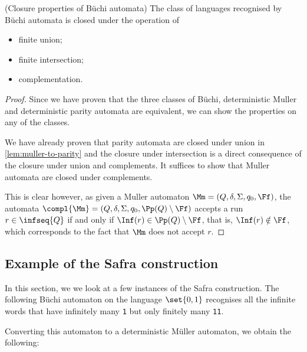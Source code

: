 \begin{theorem}(Closure properties of Büchi automata)
    \label{thm:closure-of-buchi}
    The class of languages recognised by Büchi automata
    is closed under the operation of \begin{itemize}
        \item finite union;
        \item finite intersection;
        \item complementation.
    \end{itemize}
\end{theorem}
\begin{proof}
    Since we have proven that the three classes of Büchi,
    deterministic Muller and deterministic parity automata
    are equivalent, we can show the properties on any of the classes.

    We have already proven that parity automata are closed
    under union in \autoref{lem:muller-to-parity}
    and the closure under intersection
    is a direct consequence of the closure under union and complements.
    It suffices to show that Muller automata are closed under complements.

    This is clear however, as given a Muller automaton $\Mm = (Q, \delta, \Sigma, q_0, \Ff)$,
    the automata $\compl{\Mm} = (Q, \delta, \Sigma, q_0, \Pp(Q) \setminus \Ff)$
    accepts a run $r \in \infseq{Q}$ if and only if $\Inf(r) \in \Pp(Q) \setminus \Ff$, that is,
    $\Inf(r) \notin \Ff$, which corresponds to the fact that $\Mm$ does not accept $r$.
\end{proof}

\subsection{Example of the Safra construction}\label{sec:safra-examples}

In this section, we we look at a few instances of the Safra construction.
The following Büchi automaton on the language $\set{0, 1}$ recognises
all the infinite words that have infinitely many \verb|1|
but only finitely many \verb|11|.

\begin{center}
    
\end{center}

Converting this automaton to a deterministic Müller automaton,
we obtain the following:

\begin{center}
    
\end{center}

